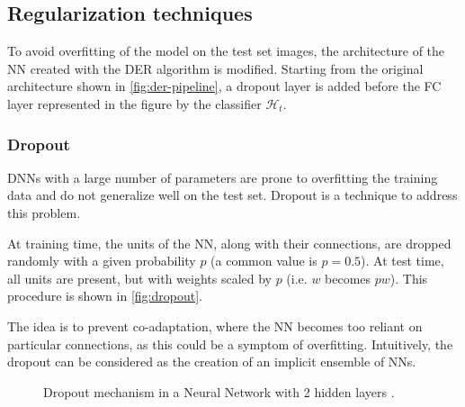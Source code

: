 \subsection{Regularization techniques}
To avoid overfitting of the model on the test set images, the architecture of the NN created with the DER algorithm is modified.
Starting from the original architecture shown in \autoref{fig:der-pipeline}, a dropout layer is added before the FC layer represented in the figure by the classifier $\mathcal{H}_t$.

\subsubsection{Dropout}
\label{sec:methods-dropout}
DNNs with a large number of parameters are prone to overfitting the training data and do not generalize well on the test set.
Dropout \cite{srivastava2014dropout} is a technique to address this problem.

At training time, the units of the NN, along with their connections, are dropped randomly with a given probability $p$ (a common value is $p = 0.5$). At test time, all units are present, but with weights scaled by $p$ (i.e. $w$ becomes $pw$). This procedure is shown in \autoref{fig:dropout}.

The idea is to prevent co-adaptation, where the NN becomes too reliant on particular connections, as this could be a symptom of overfitting. Intuitively, the dropout can be considered as the creation of an implicit ensemble of NNs.

\begin{figure}%
	\centering
	\hspace*{2cm}
	\caption{Dropout mechanism in a Neural Network with 2 hidden layers \cite{srivastava2014dropout}.}%
	\label{fig:dropout}%
\end{figure}

